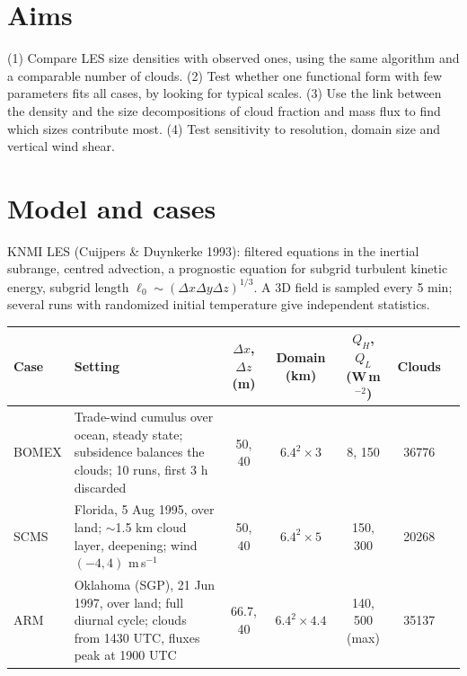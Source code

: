 \documentclass[10pt,a4paper]{article}
\begin{document}
\section{Aims}
(1) Compare LES size densities with observed ones, using the same algorithm and a comparable number of clouds. (2) Test whether one functional form with few parameters fits all cases, by looking for typical scales. (3) Use the link between the density and the size decompositions of cloud fraction and mass flux to find which sizes contribute most. (4) Test sensitivity to resolution, domain size and vertical wind shear.

\section{Model and cases}
KNMI LES (Cuijpers \& Duynkerke 1993): filtered equations in the inertial subrange, centred advection, a prognostic equation for subgrid turbulent kinetic energy, subgrid length $\ell_0\sim(\Delta x\Delta y\Delta z)^{1/3}$. A 3D field is sampled every 5 min; several runs with randomized initial temperature give independent statistics.

\smallskip
{\small\setlength{\tabcolsep}{4pt}\begin{tabular}{@{}lp{76mm}ccccr@{}}
\toprule
Case & Setting & $\Delta x$, $\Delta z$ (m) & Domain (km) & $Q_H$, $Q_L$ (W\,m$^{-2}$) & Clouds\\
\midrule
BOMEX & Trade-wind cumulus over ocean, steady state; subsidence balances the clouds; 10 runs, first 3 h discarded & 50, 40 & $6.4^2\times3$ & 8, 150 & \num{36776}\\
SCMS & Florida, 5 Aug 1995, over land; $\sim$1.5 km cloud layer, deepening; wind $(-4,4)$ m\,s$^{-1}$ & 50, 40 & $6.4^2\times5$ & 150, 300 & \num{20268}\\
ARM & Oklahoma (SGP), 21 Jun 1997, over land; full diurnal cycle; clouds from 1430 UTC, fluxes peak at 1900 UTC & 66.7, 40 & $6.4^2\times4.4$ & 140, 500 (max) & \num{35137}\\
\bottomrule
\end{tabular}}
\smallskip
\end{document}
